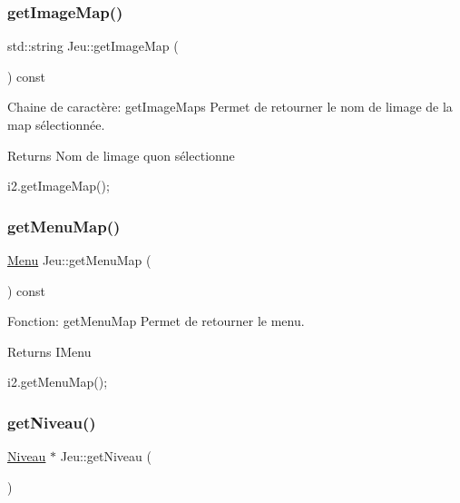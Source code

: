 \subsubsection{\texorpdfstring{get\+Image\+Map()}{getImageMap()}}
{\footnotesize\ttfamily std\+::string Jeu\+::get\+Image\+Map (\begin{DoxyParamCaption}{ }\end{DoxyParamCaption}) const}



Chaine de caractère\+: get\+Image\+Maps Permet de retourner le nom de l\textquotesingle{}image de la map sélectionnée. 

\begin{DoxyReturn}{Returns}
Nom de l\textquotesingle{}image qu\textquotesingle{}on sélectionne 
\begin{DoxyCode}
i2.getImageMap();
\end{DoxyCode}
 
\end{DoxyReturn}
\mbox{\label{classJeu_a4cbd54926ccb9f9481643d536378b7c7}} 
\subsubsection{\texorpdfstring{get\+Menu\+Map()}{getMenuMap()}}
{\footnotesize\ttfamily \hyperlink{classMenu}{Menu} Jeu\+::get\+Menu\+Map (\begin{DoxyParamCaption}{ }\end{DoxyParamCaption}) const}



Fonction\+: get\+Menu\+Map Permet de retourner le menu. 

\begin{DoxyReturn}{Returns}
I\+Menu 
\begin{DoxyCode}
i2.getMenuMap();
\end{DoxyCode}
 
\end{DoxyReturn}
\mbox{\label{classJeu_a71bf0b5329ade330d95318b50d1e2f12}} 
\subsubsection{\texorpdfstring{get\+Niveau()}{getNiveau()}}
{\footnotesize\ttfamily \hyperlink{classNiveau}{Niveau} $\ast$ Jeu\+::get\+Niveau (\begin{DoxyParamCaption}{ }\end{DoxyParamCaption})}



